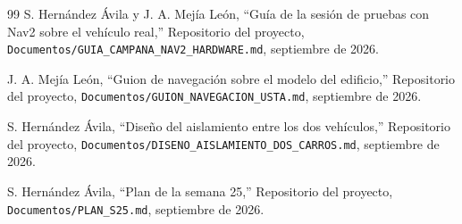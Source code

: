 \documentclass[12pt,letterpaper]{article}
\begin{document}
\begin{thebibliography}{99}
S. Hernández Ávila y J. A. Mejía León,
``Guía de la sesión de pruebas con Nav2 sobre el vehículo real,''
Repositorio del proyecto, \texttt{Documentos/GUIA\_CAMPANA\_NAV2\_HARDWARE.md}, septiembre de 2026.

J. A. Mejía León,
``Guion de navegación sobre el modelo del edificio,''
Repositorio del proyecto, \texttt{Documentos/GUION\_NAVEGACION\_USTA.md}, septiembre de 2026.

S. Hernández Ávila,
``Diseño del aislamiento entre los dos vehículos,''
Repositorio del proyecto, \texttt{Documentos/DISENO\_AISLAMIENTO\_DOS\_CARROS.md}, septiembre de 2026.

S. Hernández Ávila,
``Plan de la semana 25,''
Repositorio del proyecto, \texttt{Documentos/PLAN\_S25.md}, septiembre de 2026.

\end{thebibliography}
\end{document}
